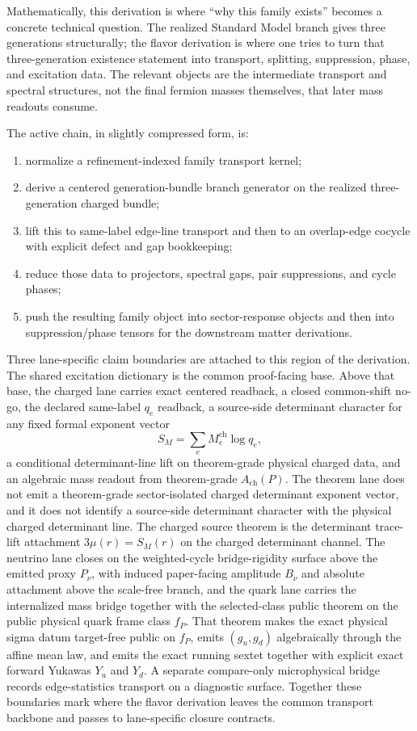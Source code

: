 \documentclass[11pt]{article}
\begin{document}
Mathematically, this derivation is where ``why this family exists'' becomes a concrete technical
question. The realized Standard Model branch gives three generations structurally; the flavor
derivation is where one tries to turn that three-generation existence statement into transport,
splitting, suppression, phase, and excitation data. The relevant objects are the intermediate
transport and spectral structures, not the final fermion masses themselves, that later mass
readouts consume.

The active chain, in slightly compressed form, is:
\begin{enumerate}[leftmargin=2em]
\item normalize a refinement-indexed family transport kernel;
\item derive a centered generation-bundle branch generator on the realized three-generation
charged bundle;
\item lift this to same-label edge-line transport and then to an overlap-edge cocycle with
explicit defect and gap bookkeeping;
\item reduce those data to projectors, spectral gaps, pair suppressions, and cycle phases;
\item push the resulting family object into sector-response objects and then into
suppression/phase tensors for the downstream matter derivations.
\end{enumerate}

Three lane-specific claim boundaries are attached to this region of the derivation. The shared
excitation dictionary is the common proof-facing base. Above that base, the charged lane carries
exact centered readback, a closed common-shift no-go, the declared same-label \(q_e\) readback, a
source-side determinant character for any fixed formal exponent vector
\[
S_M=\sum_e M_e^{\mathrm{ch}}\log q_e,
\]
a conditional determinant-line lift on theorem-grade physical charged data, and an algebraic mass
readout from theorem-grade \(A_{\mathrm{ch}}(P)\). The theorem lane does not emit a theorem-grade
sector-isolated charged determinant exponent vector, and it does not identify a source-side
determinant character with the physical charged determinant line. The charged source theorem is the
determinant trace-lift attachment \(3\mu(r)=S_M(r)\) on the charged determinant channel. The neutrino lane closes on the weighted-cycle
bridge-rigidity surface above the emitted proxy \(P_\nu\), with induced paper-facing amplitude \(B_\nu\) and absolute attachment above the scale-free branch, and the quark
lane carries the internalized mass bridge together with the selected-class public theorem on the
public physical quark frame class \(f_P\). That theorem makes the exact physical sigma datum
target-free public on \(f_P\), emits \((g_u,g_d)\) algebraically through the affine mean law,
and emits the exact running sextet together with explicit exact forward Yukawas \(Y_u\) and
\(Y_d\). A separate compare-only microphysical bridge records edge-statistics transport on a
diagnostic surface. Together these boundaries mark where the flavor
derivation leaves the common transport backbone and passes to lane-specific closure contracts.
\end{document}
